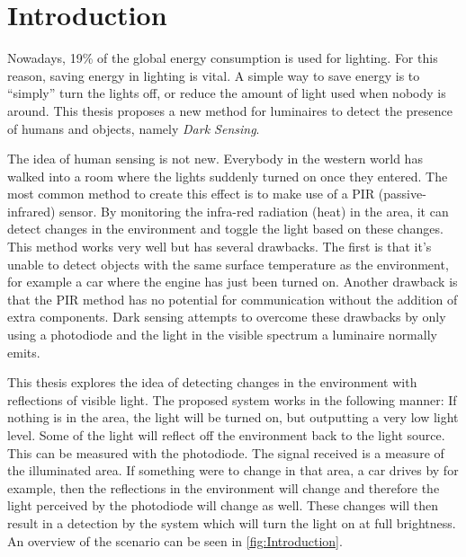 \chapter{Introduction}
\label{chp:introduction}
Nowadays, 19\% of the global energy consumption is used for lighting. For this reason, saving energy in lighting is vital. A simple way to save energy is to “simply” turn the lights off, or reduce the amount of light used when nobody is around. This thesis proposes a new method for luminaires to detect the presence of humans and objects, namely \textit{Dark Sensing}.

The idea of human sensing is not new. Everybody in the western world has walked into a room where the lights suddenly turned on once they entered. The most common method to create this effect is to make use of a PIR (passive-infrared) sensor. By monitoring the infra-red radiation (heat) in the area, it can detect changes in the environment and toggle the light based on these changes. This method works very well but has several drawbacks. The first is that it's unable to detect objects with the same surface temperature as the environment, for example a car where the engine has just been turned on. Another drawback is that the PIR method has no potential for communication without the addition of extra components. Dark sensing attempts to overcome these drawbacks by only using a photodiode and the light in the visible spectrum a luminaire normally emits.

This thesis explores the idea of detecting changes in the environment with reflections of visible light. The proposed system works in the following manner: If nothing is in the area, the light will be turned on, but outputting a very low light level. Some of the light will reflect off the environment back to the light source. This can be measured with the photodiode. The signal received is a measure of the illuminated area. If something were to change in that area, a car drives by for example, then the reflections in the environment will change and therefore the light perceived by the photodiode will change as well. These changes will then result in a detection by the system which will turn the light on at full brightness. An overview of the scenario can be seen in \ref{fig:Introduction}.

